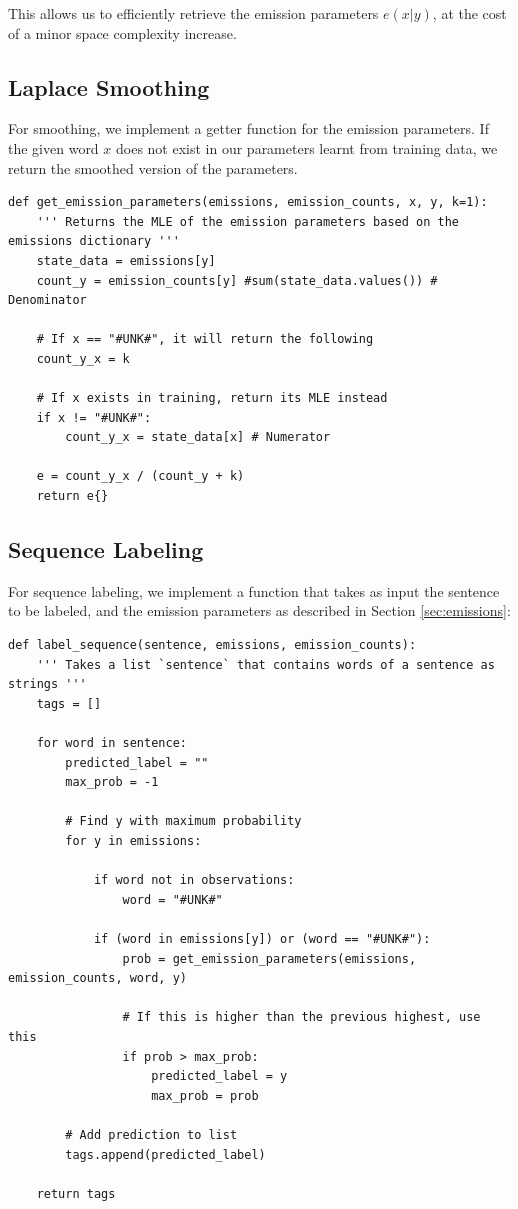 \documentclass{article}
\begin{document}
This allows us to efficiently retrieve the emission parameters $e(x|y)$, at the cost of a minor space complexity increase.

\subsection{Laplace Smoothing}

For smoothing, we implement a getter function for the emission parameters. If the given word $x$ does not exist in our parameters learnt from training data, we return the smoothed version of the parameters.

\begin{verbatim}
def get_emission_parameters(emissions, emission_counts, x, y, k=1):
    ''' Returns the MLE of the emission parameters based on the emissions dictionary '''
    state_data = emissions[y]
    count_y = emission_counts[y] #sum(state_data.values()) # Denominator
    
    # If x == "#UNK#", it will return the following
    count_y_x = k
    
    # If x exists in training, return its MLE instead
    if x != "#UNK#":
        count_y_x = state_data[x] # Numerator
    
    e = count_y_x / (count_y + k)
    return e{}
\end{verbatim}

\subsection{Sequence Labeling}

For sequence labeling, we implement a function that takes as input the sentence to be labeled, and the emission parameters as described in Section \ref{sec:emissions}:

\begin{verbatim}
def label_sequence(sentence, emissions, emission_counts):
    ''' Takes a list `sentence` that contains words of a sentence as strings '''
    tags = []
    
    for word in sentence:
        predicted_label = ""
        max_prob = -1
        
        # Find y with maximum probability
        for y in emissions:
            
            if word not in observations:
                word = "#UNK#"
            
            if (word in emissions[y]) or (word == "#UNK#"):
                prob = get_emission_parameters(emissions, emission_counts, word, y)
            
                # If this is higher than the previous highest, use this
                if prob > max_prob:
                    predicted_label = y
                    max_prob = prob

        # Add prediction to list
        tags.append(predicted_label)
    
    return tags
\end{verbatim}
\end{document}
